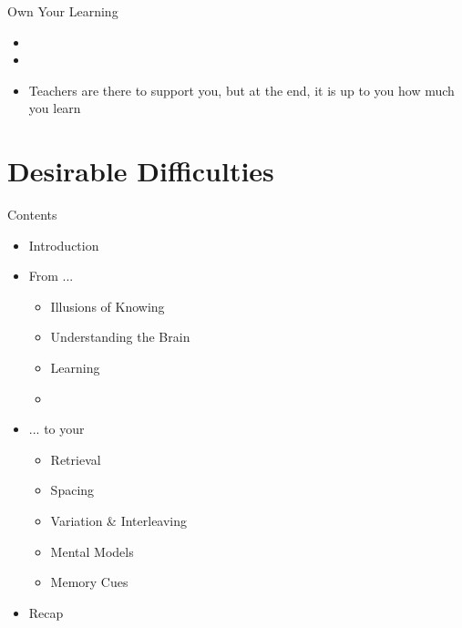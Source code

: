 \documentclass{ercisbeamer}
\begin{document}
\begin{frame}{Own Your Learning}
    \begin{tbox}
        \begin{itemize}
            \item {}
            \item {}
            \item Teachers are there to support you, but at the end, it is up to you how much you learn
        \end{itemize}
    \end{tbox}
\end{frame}
\setbgimage{}

\section{Desirable Difficulties}
\begin{frame}{Contents}
    \begin{itemize}
        \item Introduction
        \item From ...
        \begin{itemize}
            \item Illusions of Knowing
            \item Understanding the Brain
            \item Learning
            \item {}
        \end{itemize}
        \item ... to your 
        \begin{itemize}
            \item Retrieval
            \item Spacing
            \item Variation \& Interleaving
            \item Mental Models
            \item Memory Cues
        \end{itemize}
        \item Recap
    \end{itemize}
\end{frame}
\end{document}
